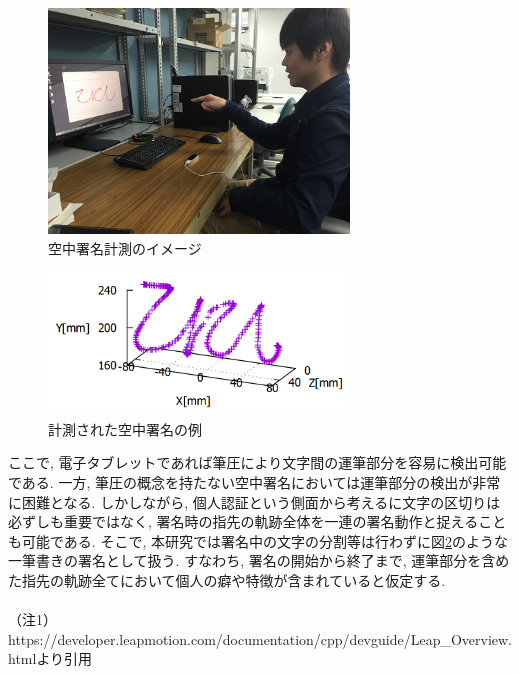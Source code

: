 \begin{figure}[htbp]
  \begin{center}
    \includegraphics[clip,width=8.0cm]{./images/Demo.png}
    \caption{空中署名計測のイメージ}
    \label{fig:Demo}
  \end{center}
\end{figure}

\begin{figure}[htbp]
  \begin{center}
    \includegraphics[clip,width=8.0cm]{./images/DemoKonishi.png}
    \caption{計測された空中署名の例}
    \label{fig:DemoKonishi}
  \end{center}
\end{figure}

\newpage

ここで, 電子タブレットであれば筆圧により文字間の運筆部分を容易に検出可能である. 一方, 筆圧の概念を持たない空中署名においては運筆部分の検出が非常に困難となる. しかしながら, 個人認証という側面から考えるに文字の区切りは必ずしも重要ではなく, 署名時の指先の軌跡全体を一連の署名動作と捉えることも可能である. そこで, 本研究では署名中の文字の分割等は行わずに図\ref{fig:DemoKonishi}のような一筆書きの署名として扱う. すなわち, 署名の開始から終了まで, 運筆部分を含めた指先の軌跡全てにおいて個人の癖や特徴が含まれていると仮定する.\\
\\
（注1） https://developer.leapmotion.com/documentation/cpp/devguide/Leap\_Overview.htmlより引用

\newpage

